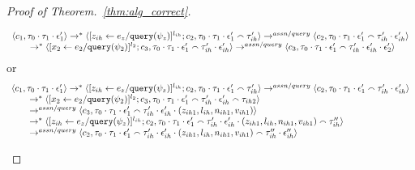 \begin{proof}[Proof of Theorem.~\ref{thm:alg_correct}]
\begin{case}
\begin{subcase}
%
\begin{equation}
\label{eq:m1asn_inv2}
  \begin{array}{l}   
  \langle c_1, \mathtt{\tau}_0 \cdot \mathtt{\tau}_1 \cdot \mathtt{\epsilon}_1' \rangle 
  \rightarrow^{*} 
  \langle [\mathrel{ z_{ih} \leftarrow e_z / {\tt query}(\psi_z) }]^{l_{ih}};{c}_2, 
  \mathtt{\tau}_0 \cdot \mathtt{\tau}_1 \cdot \mathtt{\epsilon}_1' \smallfrown \mathtt{\tau}_{ih}' \rangle 
  \rightarrow^{assn/query} 
  \langle {c}_2,  \mathtt{\tau}_0 \cdot \mathtt{\tau}_1 \cdot \mathtt{\epsilon}_1'  \smallfrown \mathtt{\tau}_{ih}' \cdot \mathtt{\epsilon}_{ih}' \rangle  \\
  \qquad \rightarrow^{*} 
  \langle [\mathrel{ {x}_2 \leftarrow e_2 / {\tt query}(\psi_2) }]^{l_2};{c}_3, 
  \mathtt{\tau}_0 \cdot \mathtt{\tau}_1 \cdot \mathtt{\epsilon}_1'  \smallfrown \mathtt{\tau}_{ih}' \cdot \mathtt{\epsilon}_{ih}' \rangle 
  \rightarrow^{assn/query} 
  \langle {c}_3,  \mathtt{\tau}_0 \cdot \mathtt{\tau}_1 \cdot \mathtt{\epsilon}_1'  \smallfrown \mathtt{\tau}_{ih}' \cdot \mathtt{\epsilon}_{ih}' \cdot \mathtt{\epsilon}_2' \rangle 
\end{array}
 \end{equation}
 or 
\[
  \begin{array}{l}   
  \langle c_1, \mathtt{\tau}_0 \cdot \mathtt{\tau}_1 \cdot \mathtt{\epsilon}_1' \rangle 
  \rightarrow^{*} 
  \langle [\mathrel{ z_{ih} \leftarrow e_z / {\tt query}(\psi_z) }]^{l_{ih}};{c}_2, 
  \mathtt{\tau}_0 \cdot \mathtt{\tau}_1 \cdot \mathtt{\epsilon}_1' \smallfrown \mathtt{\tau}_{ih}' \rangle 
  \rightarrow^{assn/query} 
  \langle {c}_2,  \mathtt{\tau}_0 \cdot \mathtt{\tau}_1 \cdot \mathtt{\epsilon}_1'  \smallfrown \mathtt{\tau}_{ih}' \cdot \mathtt{\epsilon}_{ih}' \rangle  \\
  \qquad \rightarrow^{*} 
  \langle [\mathrel{ {x}_2 \leftarrow e_2 / {\tt query}(\psi_2) }]^{l_2};{c}_3, 
  \mathtt{\tau}_0 \cdot \mathtt{\tau}_1 \cdot \mathtt{\epsilon}_1'  \smallfrown \mathtt{\tau}_{ih}' \cdot \mathtt{\epsilon}_{ih}' \smallfrown \mathtt{\tau}_{ih2} \rangle 
  \\ \qquad
  \rightarrow^{assn/query} 
  \langle {c}_3,  \mathtt{\tau}_0 \cdot \mathtt{\tau}_1 \cdot \mathtt{\epsilon}_1'  \smallfrown \mathtt{\tau}_{ih}' \cdot \mathtt{\epsilon}_{ih}' \cdot (z_{ih1}, l_{ih}, n_{ih1}, v_{ih1}) \rangle 
  \\ \qquad
  \rightarrow^{*} 
  \langle [\mathrel{ z_{ih} \leftarrow e_z / {\tt query}(\psi_z) }]^{l_{ih}};{c}_2, 
  \mathtt{\tau}_0 \cdot \mathtt{\tau}_1 \cdot \mathtt{\epsilon}_1' \smallfrown \mathtt{\tau}_{ih}' \cdot \mathtt{\epsilon}_{ih}' \cdot (z_{ih1}, l_{ih}, n_{ih1}, v_{ih1}) \smallfrown \mathtt{\tau}_{ih}'' \rangle 
  \\ \qquad
  \rightarrow^{assn/query} 
  \langle {c}_2,  \mathtt{\tau}_0 \cdot \mathtt{\tau}_1 \cdot \mathtt{\epsilon}_1'  \smallfrown \mathtt{\tau}_{ih}' \cdot \mathtt{\epsilon}_{ih}' \cdot (z_{ih1}, l_{ih}, n_{ih1}, v_{ih1}) \smallfrown \mathtt{\tau}_{ih}'' \cdot \mathtt{\epsilon}_{ih}'' \rangle  
  \\

\end{array}\]
\end{subcase}
\end{case}
\end{proof}
